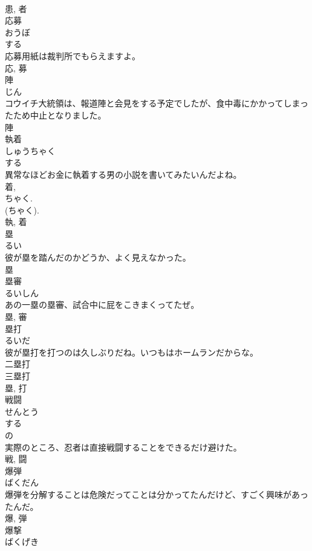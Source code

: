 \documentclass[8pt]{extreport}
\begin{document}
\begin{CJK}{UTF8}{min}
\\	患, 者	
\\	応募	
\\	おうぼ	
\\	する 
\\	応募用紙は裁判所でもらえますよ。	
\\	応, 募	
\\	陣	
\\	じん	
\\	コウイチ大統領は、報道陣と会見をする予定でしたが、食中毒にかかってしまったため中止となりました。	
\\	陣	
\\	執着	
\\	しゅうちゃく	
\\	する 
\\	異常なほどお金に執着する男の小説を書いてみたいんだよね。	
\\	着, 
\\	ちゃく. 
\\	(ちゃく). 
\\	執, 着	
\\	塁	
\\	るい	
\\	彼が塁を踏んだのかどうか、よく見えなかった。	
\\	塁	
\\	塁審	
\\	るいしん	
\\	あの一塁の塁審、試合中に屁をこきまくってたぜ。	
\\	塁, 審	
\\	塁打	
\\	るいだ	
\\	彼が塁打を打つのは久しぶりだね。いつもはホームランだからな。	
\\	二塁打 
\\	三塁打 
\\	塁, 打	
\\	戦闘	
\\	せんとう	
\\	する 
\\	の 
\\	実際のところ、忍者は直接戦闘することをできるだけ避けた。	
\\	戦, 闘	
\\	爆弾	
\\	ばくだん	
\\	爆弾を分解することは危険だってことは分かってたんだけど、すごく興味があったんだ。	
\\	爆, 弾	
\\	爆撃	
\\	ばくげき	

\end{CJK}
\end{document}
